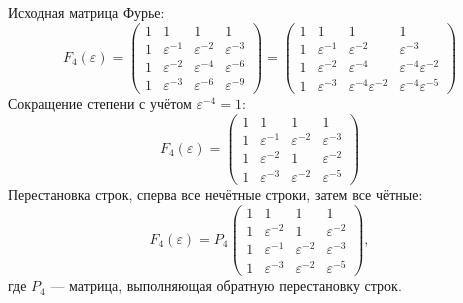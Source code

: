 Исходная матрица Фурье:
\[
    F_4(\varepsilon)
    = \begin{pmatrix}
        1 & 1                & 1                & 1                \\
        1 & \varepsilon^{-1} & \varepsilon^{-2} & \varepsilon^{-3} \\
        1 & \varepsilon^{-2} & \varepsilon^{-4} & \varepsilon^{-6} \\
        1 & \varepsilon^{-3} & \varepsilon^{-6} & \varepsilon^{-9}
    \end{pmatrix}
    = \begin{pmatrix}
        1 & 1                & 1                                 & 1                                 \\
        1 & \varepsilon^{-1} & \varepsilon^{-2}                  & \varepsilon^{-3}                  \\
        1 & \varepsilon^{-2} & \varepsilon^{-4}                  & \varepsilon^{-4} \varepsilon^{-2} \\
        1 & \varepsilon^{-3} & \varepsilon^{-4} \varepsilon^{-2} & \varepsilon^{-4} \varepsilon^{-5}
    \end{pmatrix}
\]
Сокращение степени с учётом $\varepsilon^{-4} = 1$:
\[
    F_4(\varepsilon)
    = \begin{pmatrix}
        1 & 1                & 1                & 1                \\
        1 & \varepsilon^{-1} & \varepsilon^{-2} & \varepsilon^{-3} \\
        1 & \varepsilon^{-2} & 1                & \varepsilon^{-2} \\
        1 & \varepsilon^{-3} & \varepsilon^{-2} & \varepsilon^{-5}
    \end{pmatrix}
\]
Перестановка строк, сперва все нечётные строки, затем все чётные:
\[
    F_4(\varepsilon)
    =
    P_4
    \begin{pmatrix}
        1 & 1                & 1                & 1                \\
        1 & \varepsilon^{-2} & 1                & \varepsilon^{-2} \\
        1 & \varepsilon^{-1} & \varepsilon^{-2} & \varepsilon^{-3} \\
        1 & \varepsilon^{-3} & \varepsilon^{-2} & \varepsilon^{-5}
    \end{pmatrix} ,
\]
где $P_4$ --- матрица, выполняющая обратную перестановку строк.

